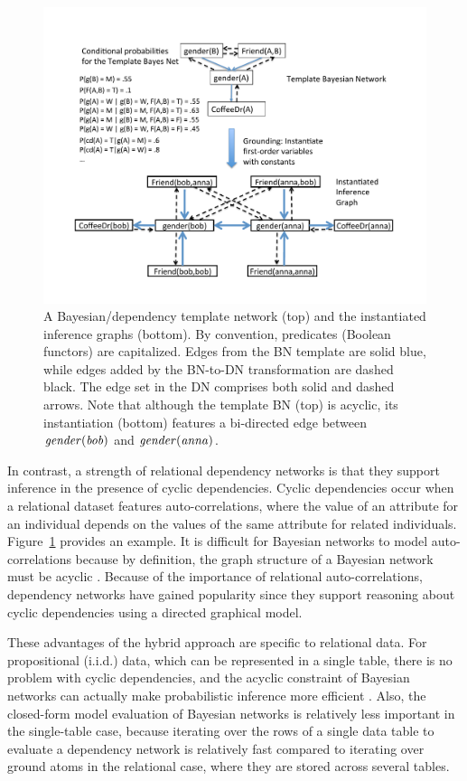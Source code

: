 \documentclass{sfuthesis}
\newcommand{\iid}{i.i.d.}
\begin{document}
\begin{figure}[!h]
\begin{center}
\includegraphics[width = 1 \textwidth]{dn.pdf}
\caption{A Bayesian/dependency template network (top) and the instantiated inference graphs (bottom). By convention, predicates (Boolean functors) are capitalized. Edges from the BN template are solid blue, while edges added by the BN-to-DN transformation are dashed black. The edge set in the DN comprises both solid and dashed arrows. Note that although the template BN (top) is acyclic, its  instantiation (bottom) features a bi-directed edge between $\it{gender}(bob)$ and $\it{gender}(anna)$. \label{fig:dn}
}
\end{center}
\end{figure} 
In contrast, a strength of relational dependency networks is that they support inference in the presence of cyclic dependencies\cite{Neville2007,Natarajan2012}. Cyclic dependencies occur when a relational dataset features auto-correlations, where the value of an attribute for an individual depends on the values of the same attribute for related individuals. Figure~\ref{fig:dn}  provides an example. It is difficult for Bayesian networks to model auto-correlations because by definition, the graph structure of a Bayesian network must be acyclic \cite{Domingos2007,Taskar2002,Getoorprm2001}. Because of the importance of relational auto-correlations, dependency networks have gained popularity since they support reasoning about cyclic dependencies using a directed graphical model. 

These advantages  of the hybrid approach are specific to relational data. For propositional (\iid) data, which can be represented in a single table, there is no problem with cyclic dependencies, and the acyclic constraint of Bayesian networks can actually make probabilistic inference more efficient \cite{Hulten2003}. Also, the closed-form model evaluation of Bayesian networks is relatively less important in the single-table case, because iterating over the rows of a single data table to evaluate a dependency network is relatively fast compared to iterating over ground atoms in the relational case, where they are stored across several tables. 
\end{document}
